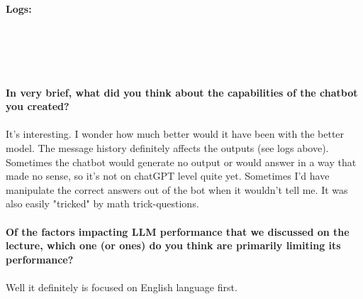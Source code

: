 \documentclass{article}
\begin{document}
\textbf{Logs:} \\\\

\\\\\\\\

\textbf{In very brief, what did you think about the capabilities of the chatbot you created?} \\\\
It's interesting. I wonder how much better would it have been with the 
better model. The message history definitely affects the outputs (see logs 
above). Sometimes the chatbot would generate no output or would answer in a 
way that made no sense, so it's not on chatGPT level quite yet. Sometimes 
I'd have manipulate the correct answers out of the bot when it wouldn't 
tell me. It was also easily "tricked" by math trick-questions. \\\\
\textbf{Of the factors impacting LLM performance that we discussed on the lecture, which one (or ones) do you think are primarily limiting its performance?} \\\\
Well it definitely is focused on English language first.
\end{document}
